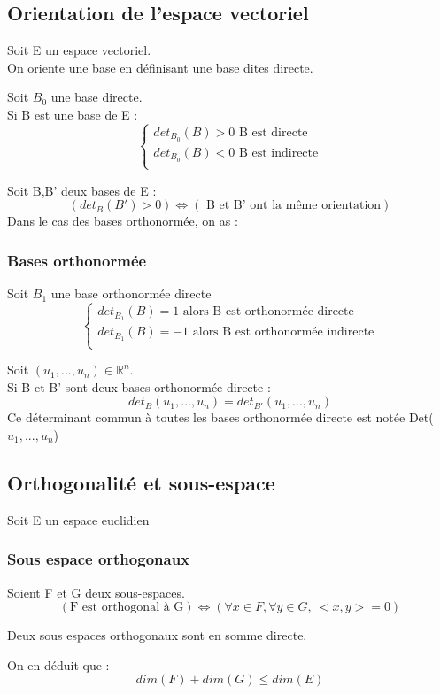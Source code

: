 \subsection{Orientation de l'espace vectoriel}
\begin{de}
Soit E un espace vectoriel.\\
On oriente une base en définisant une base dites directe.
\end{de}
\begin{prop}
Soit $B_0$ une base directe.\\
Si B est une base de E : 
\[\left\{\begin{array}{l}
   det_{B_0}(B) > 0 \mbox{ B est directe}\\
   det_{B_0}(B) < 0 \mbox{ B est indirecte}\\
  \end{array}\right.\]
\end{prop}
\begin{prop}
Soit B,B' deux bases de E :
$$(det_B(B') > 0) \Leftrightarrow (\mbox{ B et B' ont la même orientation})$$
Dans le cas des bases orthonormée, on as : 
\end{prop}
\subsubsection{Bases orthonormée}
\begin{prop}
Soit $B_1$ une base orthonormée directe
\[\left\{\begin{array}{l}
   det_{B_1}(B) = 1 \mbox{ alors B est orthonormée directe}\\
   det_{B_1}(B) = -1 \mbox{ alors B est orthonormée indirecte}\\
  \end{array}\right.\]
\end{prop}
\begin{prop}
Soit $(u_1,...,u_n) \in \mathbb{R}^n$.\\
Si B et B' sont deux bases orthonormée directe : 
$$det_B(u_1,...,u_n) = det_{B'}(u_1,...,u_n)$$
Ce déterminant commun à toutes les bases orthonormée directe est notée Det($u_1,...,u_n$)
\end{prop}
\subsection{Orthogonalité et sous-espace}
Soit E un espace euclidien
\subsubsection{Sous espace orthogonaux}
\begin{de}
Soient F et G deux sous-espaces.
$$(\mbox{F est orthogonal à G})\Leftrightarrow (\forall x \in F,\forall y \in G,~ <x,y>=0)$$
\end{de}
\begin{prop}
Deux sous espaces orthogonaux sont en somme directe.
\end{prop}
\begin{prop}
On en déduit que : 
$$dim(F)+dim(G) \leq dim(E)$$
\end{prop}
